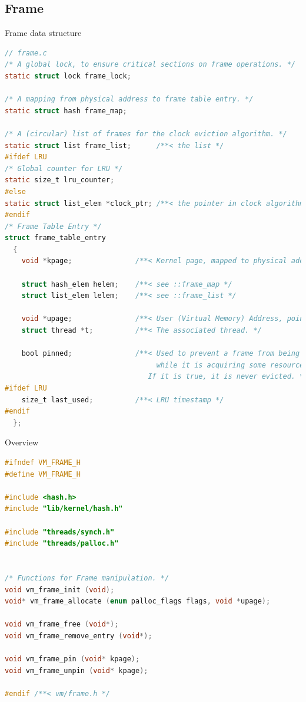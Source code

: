 \documentclass[10pt]{beamer}
\begin{document}
\subsection{Frame}
\begin{frame}[fragile]{Frame data structure}
\begin{lstlisting}[language=C]
// frame.c
/* A global lock, to ensure critical sections on frame operations. */
static struct lock frame_lock;

/* A mapping from physical address to frame table entry. */
static struct hash frame_map;

/* A (circular) list of frames for the clock eviction algorithm. */
static struct list frame_list;      /**< the list */
#ifdef LRU
/* Global counter for LRU */
static size_t lru_counter;
#else
static struct list_elem *clock_ptr; /**< the pointer in clock algorithm */
#endif
/* Frame Table Entry */
struct frame_table_entry
  {
    void *kpage;               /**< Kernel page, mapped to physical address */

    struct hash_elem helem;    /**< see ::frame_map */
    struct list_elem lelem;    /**< see ::frame_list */

    void *upage;               /**< User (Virtual Memory) Address, pointer to page */
    struct thread *t;          /**< The associated thread. */

    bool pinned;               /**< Used to prevent a frame from being evicted,
                                    while it is acquiring some resources.
                                  If it is true, it is never evicted. */
#ifdef LRU
    size_t last_used;          /**< LRU timestamp */
#endif
  };
\end{lstlisting}
\end{frame}
\begin{frame}[fragile]{Overview}
\begin{lstlisting}[language=C]
#ifndef VM_FRAME_H
#define VM_FRAME_H

#include <hash.h>
#include "lib/kernel/hash.h"

#include "threads/synch.h"
#include "threads/palloc.h"


/* Functions for Frame manipulation. */
void vm_frame_init (void);
void* vm_frame_allocate (enum palloc_flags flags, void *upage);

void vm_frame_free (void*);
void vm_frame_remove_entry (void*);

void vm_frame_pin (void* kpage);
void vm_frame_unpin (void* kpage);

#endif /**< vm/frame.h */

\end{lstlisting}
\end{frame}
\end{document}
